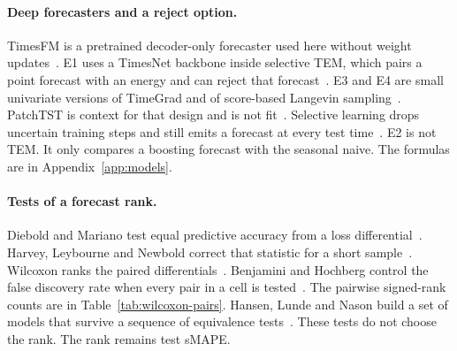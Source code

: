 \paragraph{Deep forecasters and a reject option.}
TimesFM is a pretrained decoder-only forecaster used here without weight updates~\citep{das2024timesfm}.
E1 uses a TimesNet backbone inside selective TEM, which pairs a point forecast with an energy and can reject that forecast~\citep{wu2023timesnet,brusokas2025tem,geifman2019selectivenet}.
E3 and E4 are small univariate versions of TimeGrad and of score-based Langevin sampling~\citep{rasul2021timegrad,song2019score}.
PatchTST is context for that design and is not fit~\citep{nie2023patchtst}.
Selective learning drops uncertain training steps and still emits a forecast at every test time~\citep{fu2025selective}.
E2 is not TEM.
It only compares a boosting forecast with the seasonal naive.
The formulas are in Appendix~\ref{app:models}.

\paragraph{Tests of a forecast rank.}
Diebold and Mariano test equal predictive accuracy from a loss differential~\citep{diebold1995comparing}.
Harvey, Leybourne and Newbold correct that statistic for a short sample~\citep{harvey1997testing}.
Wilcoxon ranks the paired differentials~\citep{wilcoxon1945individual}.
Benjamini and Hochberg control the false discovery rate when every pair in a cell is tested~\citep{benjamini1995fdr}.
The pairwise signed-rank counts are in Table~\ref{tab:wilcoxon-pairs}.
Hansen, Lunde and Nason build a set of models that survive a sequence of equivalence tests~\citep{hansen2011mcs}.
These tests do not choose the rank.
The rank remains test sMAPE.
